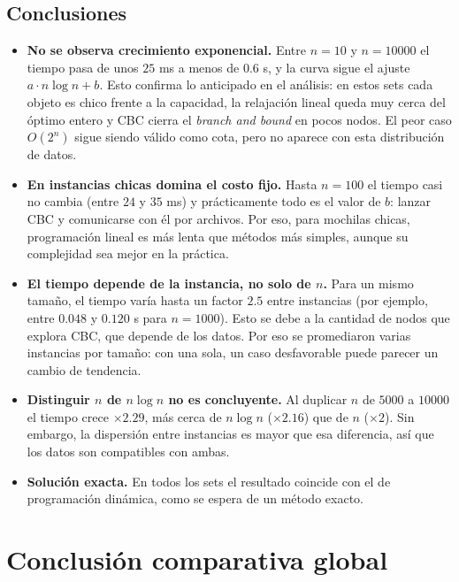 \documentclass[11pt,a4paper]{article}
\begin{document}
\subsection{Conclusiones}
\begin{itemize}
    \item \textbf{No se observa crecimiento exponencial.} Entre $n = 10$ y $n = 10000$ el tiempo pasa de unos $25$ ms a menos de $0.6$ s, y la curva sigue el ajuste $a \cdot n \log n + b$. Esto confirma lo anticipado en el análisis: en estos sets cada objeto es chico frente a la capacidad, la relajación lineal queda muy cerca del óptimo entero y CBC cierra el \textit{branch and bound} en pocos nodos. El peor caso $O(2^n)$ sigue siendo válido como cota, pero no aparece con esta distribución de datos.
    \item \textbf{En instancias chicas domina el costo fijo.} Hasta $n = 100$ el tiempo casi no cambia (entre $24$ y $35$ ms) y prácticamente todo es el valor de $b$: lanzar CBC y comunicarse con él por archivos. Por eso, para mochilas chicas, programación lineal es más lenta que métodos más simples, aunque su complejidad sea mejor en la práctica.
    \item \textbf{El tiempo depende de la instancia, no solo de $n$.} Para un mismo tamaño, el tiempo varía hasta un factor $2.5$ entre instancias (por ejemplo, entre $0.048$ y $0.120$ s para $n = 1000$). Esto se debe a la cantidad de nodos que explora CBC, que depende de los datos. Por eso se promediaron varias instancias por tamaño: con una sola, un caso desfavorable puede parecer un cambio de tendencia.
    \item \textbf{Distinguir $n$ de $n \log n$ no es concluyente.} Al duplicar $n$ de $5000$ a $10000$ el tiempo crece $\times 2.29$, más cerca de $n \log n$ ($\times 2.16$) que de $n$ ($\times 2$). Sin embargo, la dispersión entre instancias es mayor que esa diferencia, así que los datos son compatibles con ambas.
    \item \textbf{Solución exacta.} En todos los sets el resultado coincide con el de programación dinámica, como se espera de un método exacto.
\end{itemize}

\newpage

\section{Conclusión comparativa global}
\label{sec:conclusion}
\end{document}
